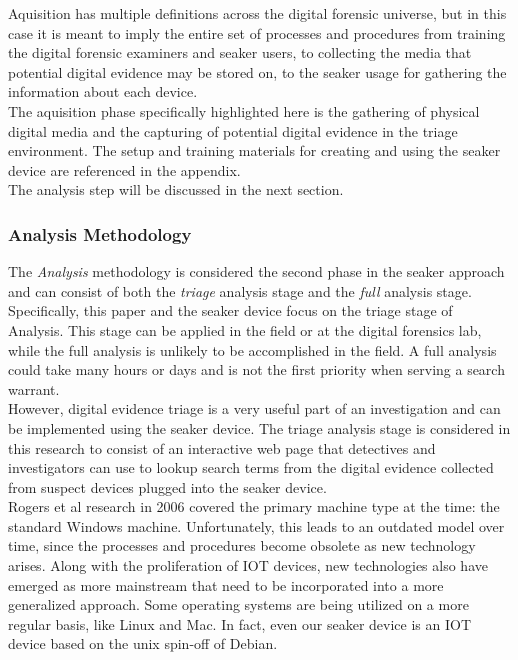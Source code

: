 \documentclass[12pt]{article}
\begin{document}
Aquisition has multiple definitions across
the digital forensic universe, but in this case it is meant to imply the entire set of processes and
procedures from training the digital forensic examiners and \gls{seaker} users,
to collecting the media that potential digital evidence may be stored on, 
to the \gls{seaker} usage for gathering the information about each device.\\

The aquisition phase specifically highlighted here is the gathering of physical digital
media and the capturing of potential digital evidence in the triage environment.  The 
setup and training materials for creating and using the \gls{seaker} device are referenced in
the appendix.\\

The analysis step will be discussed in the next section.\\



\subsubsection{Analysis Methodology}

The {\em Analysis} methodology is considered the second phase in the \gls{seaker} approach and 
can consist of both the {\em triage} analysis stage and the {\em full} analysis stage.
Specifically, this paper and the \gls{seaker} device focus on the triage stage of Analysis.  This
stage can be applied in the field or at the digital forensics lab, while the full analysis
is unlikely to be accomplished in the field.  A full analysis could take many hours or days
and is not the first priority when serving a search warrant.\\

However, digital evidence triage is a very useful part of an investigation and can be 
implemented using the \gls{seaker} device.  The triage analysis stage is considered in this research
to consist of an interactive web page that detectives and investigators can use to 
lookup search terms from the digital evidence collected from suspect devices plugged into the
\gls{seaker} device.\\

Rogers et al\cite{rogers2006computer} research in 2006 covered the primary machine type at
the time: the standard Windows machine.  Unfortunately, this leads to an outdated model over
time, since the processes and procedures become obsolete as new technology arises.  Along with
the proliferation of IOT devices, new technologies also have emerged as more mainstream that
need to be incorporated into a more generalized approach.  Some operating systems are being
utilized on a more regular basis, like Linux and Mac.  In fact, even our \gls{seaker} device is
an IOT device based on the unix spin-off of Debian.\\
\end{document}

